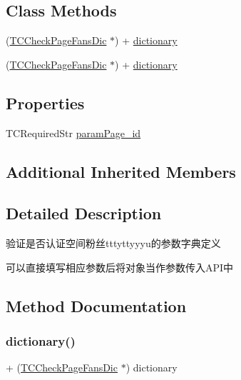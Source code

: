 \subsection*{Class Methods}
\begin{DoxyCompactItemize}
\item 
(\mbox{\hyperlink{interface_t_c_check_page_fans_dic}{T\+C\+Check\+Page\+Fans\+Dic}} $\ast$) + \mbox{\hyperlink{interface_t_c_check_page_fans_dic_a7c143b4796a1d118fdd40006342d70ab}{dictionary}}
\item 
(\mbox{\hyperlink{interface_t_c_check_page_fans_dic}{T\+C\+Check\+Page\+Fans\+Dic}} $\ast$) + \mbox{\hyperlink{interface_t_c_check_page_fans_dic_a7c143b4796a1d118fdd40006342d70ab}{dictionary}}
\end{DoxyCompactItemize}
\subsection*{Properties}
\begin{DoxyCompactItemize}
\item 
T\+C\+Required\+Str \mbox{\hyperlink{interface_t_c_check_page_fans_dic_a8d73f700b9cb0cfe6419cb4b2e9c50bb}{param\+Page\+\_\+id}}
\end{DoxyCompactItemize}
\subsection*{Additional Inherited Members}


\subsection{Detailed Description}
验证是否认证空间粉丝tttyttyyyu的参数字典定义 

可以直接填写相应参数后将对象当作参数传入\+A\+P\+I中 

\subsection{Method Documentation}
\mbox{\label{interface_t_c_check_page_fans_dic_a7c143b4796a1d118fdd40006342d70ab}} 
\subsubsection{\texorpdfstring{dictionary()}{dictionary()}\hspace{0.1cm}{\footnotesize\ttfamily [1/2]}}
{\footnotesize\ttfamily + (\mbox{\hyperlink{interface_t_c_check_page_fans_dic}{T\+C\+Check\+Page\+Fans\+Dic}} $\ast$) dictionary \begin{DoxyParamCaption}{ }\end{DoxyParamCaption}}

